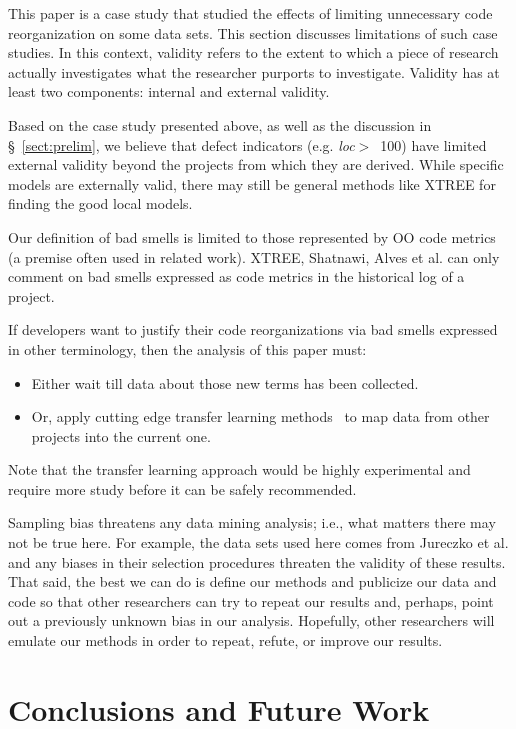 \documentclass[sigconf, proceedings, 9pt]{acmart}
\newcommand{\tion}[1]{\S~\ref{sect:#1}}
\begin{document}
This paper is a case study that studied the effects of  limiting 
unnecessary code reorganization on some data sets. This section discusses 
limitations of such case studies. In this context, validity refers to the 
extent to which a piece of research actually
investigates what the researcher purports to investigate.
Validity has at least two components: internal and
external validity.


Based on the case study presented above,
as well as the discussion in \tion{prelim},
we believe that defect indicators (e.g. \mbox{{\em loc}$>$ 100})
have limited external validity beyond the projects from which they are 
derived.
While specific models are externally valid,
there may still be general methods like XTREE for finding the good local 
models.

Our definition of bad smells is limited to those represented by OO code 
metrics (a premise often used in related work).
XTREE, Shatnawi, Alves et al. can  only comment
on bad smells   expressed as code metrics
in the historical log of a project.

If developers want to justify their code reorganizations
via bad smells expressed in other terminology,
then the  analysis of this paper must:
\begin{itemize}
	\item Either wait till
	data about those new
	terms has been collected.
	\item Or, apply cutting edge transfer learning
	methods~\cite{Nam15,Jing15, krishna16} to map data from other projects
	into the current one.
\end{itemize}
Note that the transfer learning approach would
be highly experimental and require more study
before it can be safely recommended.

Sampling bias threatens any data mining analysis; i.e., what matters
there may not be true here. For example, the data sets used here comes 
from 
Jureczko et al. and any biases in their selection procedures
threaten the validity of these results.
That said,
the best we can do is define our methods and publicize our data and code so 
that other researchers can
try to repeat our results and, perhaps, point out a previously unknown bias
in our analysis. Hopefully, other researchers will emulate our methods in
order to repeat, refute, or improve our results.


\section{Conclusions and Future Work}
\label{sect:conclusion}


\balance


\end{document}
